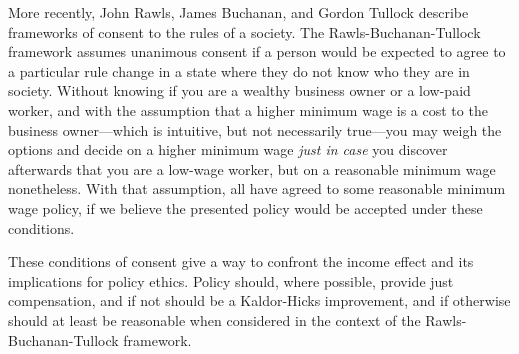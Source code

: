 More recently, John Rawls, James Buchanan, and Gordon Tullock describe frameworks of consent to the rules of a society.  The Rawls-Buchanan-Tullock framework assumes unanimous consent if a person would be expected to agree to a particular rule change in a state where they do not know who they are in society.  Without knowing if you are a wealthy business owner or a low-paid worker, and with the assumption that a higher minimum wage is a cost to the business owner—which is intuitive, but not necessarily true—you may weigh the options and decide on a higher minimum wage \textit{just in case} you discover afterwards that you are a low-wage worker, but on a reasonable minimum wage nonetheless.  With that assumption, all have agreed to some reasonable minimum wage policy, if we believe the presented policy would be accepted under these conditions.

These conditions of consent give a way to confront the income effect and its implications for policy ethics.  Policy should, where possible, provide just compensation, and if not should be a Kaldor-Hicks improvement, and if otherwise should at least be reasonable when considered in the context of the Rawls-Buchanan-Tullock framework.
